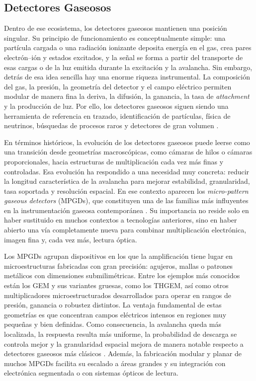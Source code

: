 \documentclass[12pt,a4paper]{article}
\begin{document}
\subsection{Detectores Gaseosos}

Dentro de ese ecosistema, los detectores gaseosos mantienen una posición singular. Su principio de funcionamiento es conceptualmente simple: una partícula cargada o una radiación ionizante deposita energía en el gas, crea pares electrón--ión y estados excitados, y la señal se forma a partir del transporte de esas cargas o de la luz emitida durante la excitación y la avalancha. Sin embargo, detrás de esa idea sencilla hay una enorme riqueza instrumental. La composición del gas, la presión, la geometría del detector y el campo eléctrico permiten modular de manera fina la deriva, la difusión, la ganancia, la tasa de \textit{attachment} y la producción de luz. Por ello, los detectores gaseosos siguen siendo una herramienta de referencia en trazado, identificación de partículas, física de neutrinos, búsquedas de procesos raros y detectores de gran volumen 
\cite{gonzlezdaz2017gaseous,hayrapetyan2024dune,next2014present,esfahani2023project}.

En términos históricos, la evolución de los detectores gaseosos puede leerse como una transición desde geometrías macroscópicas, como cámaras de hilos o cámaras proporcionales, hacia estructuras de multiplicación cada vez más finas y controladas. Esa evolución ha respondido a una necesidad muy concreta: reducir la longitud característica de la avalancha para mejorar estabilidad, granularidad, tasa soportada y resolución espacial. En ese contexto aparecen los \emph{micro-pattern gaseous detectors} (MPGDs), que constituyen una de las familias más influyentes en la instrumentación gaseosa contemporánea \cite{shekhtman2002micropattern,buzulutskov2007radiation}. Su importancia no reside solo en haber sustituido en muchos contextos a tecnologías anteriores, sino en haber abierto una vía completamente nueva para combinar multiplicación electrónica, imagen fina y, cada vez más, lectura óptica.

Los MPGDs agrupan dispositivos en los que la amplificación tiene lugar en microestructuras fabricadas con gran precisión: agujeros, mallas o patrones metálicos con dimensiones submilimétricas. Entre los ejemplos más conocidos están los GEM y sus variantes gruesas, como los THGEM, así como otros multiplicadores microestructurados desarrollados para operar en rangos de presión, ganancia o robustez distintos. La ventaja fundamental de estas geometrías es que concentran campos eléctricos intensos en regiones muy pequeñas y bien definidas. Como consecuencia, la avalancha queda más localizada, la respuesta resulta más uniforme, la probabilidad de descarga se controla mejor y la granularidad espacial mejora de manera notable respecto a detectores gaseosos más clásicos \cite{shekhtman2002micropattern,buzulutskov2007radiation,azevedo2016thgem}. Además, la fabricación modular y planar de muchos MPGDs facilita su escalado a áreas grandes y su integración con electrónica segmentada o con sistemas ópticos de lectura.
\end{document}
